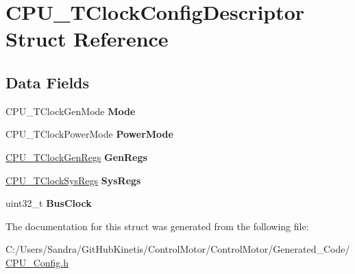 \hypertarget{struct_c_p_u___t_clock_config_descriptor}{}\section{C\+P\+U\+\_\+\+T\+Clock\+Config\+Descriptor Struct Reference}
\label{struct_c_p_u___t_clock_config_descriptor}
\subsection*{Data Fields}
\begin{DoxyCompactItemize}
\item 
C\+P\+U\+\_\+\+T\+Clock\+Gen\+Mode {\bfseries Mode}\hypertarget{struct_c_p_u___t_clock_config_descriptor_adcec1118d3d499307f8109fd8f4b9cb3}{}\label{struct_c_p_u___t_clock_config_descriptor_adcec1118d3d499307f8109fd8f4b9cb3}

\item 
C\+P\+U\+\_\+\+T\+Clock\+Power\+Mode {\bfseries Power\+Mode}\hypertarget{struct_c_p_u___t_clock_config_descriptor_a103afe29742906075a1c6a7daaa359d6}{}\label{struct_c_p_u___t_clock_config_descriptor_a103afe29742906075a1c6a7daaa359d6}

\item 
\hyperlink{struct_c_p_u___t_clock_gen_regs}{C\+P\+U\+\_\+\+T\+Clock\+Gen\+Regs} {\bfseries Gen\+Regs}\hypertarget{struct_c_p_u___t_clock_config_descriptor_a1eefad6d83e05f7d438ca57f8d2fa587}{}\label{struct_c_p_u___t_clock_config_descriptor_a1eefad6d83e05f7d438ca57f8d2fa587}

\item 
\hyperlink{struct_c_p_u___t_clock_sys_regs}{C\+P\+U\+\_\+\+T\+Clock\+Sys\+Regs} {\bfseries Sys\+Regs}\hypertarget{struct_c_p_u___t_clock_config_descriptor_abaf4a355f49bec0b7e8893c20d0c9219}{}\label{struct_c_p_u___t_clock_config_descriptor_abaf4a355f49bec0b7e8893c20d0c9219}

\item 
uint32\+\_\+t {\bfseries Bus\+Clock}\hypertarget{struct_c_p_u___t_clock_config_descriptor_a9550fb52c3c46ab596227d3179586d60}{}\label{struct_c_p_u___t_clock_config_descriptor_a9550fb52c3c46ab596227d3179586d60}

\end{DoxyCompactItemize}


The documentation for this struct was generated from the following file\+:\begin{DoxyCompactItemize}
\item 
C\+:/\+Users/\+Sandra/\+Git\+Hub\+Kinetis/\+Control\+Motor/\+Control\+Motor/\+Generated\+\_\+\+Code/\hyperlink{_c_p_u___config_8h}{C\+P\+U\+\_\+\+Config.\+h}\end{DoxyCompactItemize}
